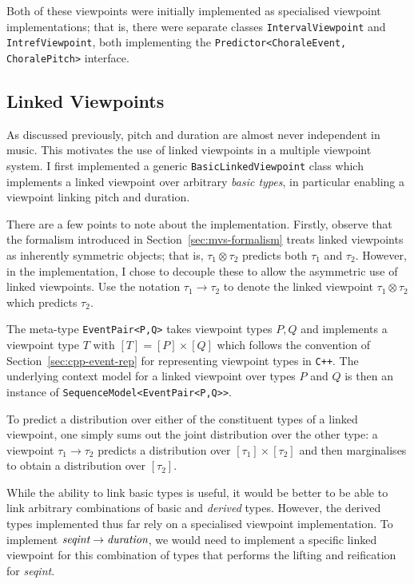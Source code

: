 \documentclass[12pt,a4paper,twoside,openright]{report}
\begin{document}
Both of these viewpoints were initially implemented as specialised viewpoint
implementations; that is, there were separate classes \texttt{IntervalViewpoint}
and \texttt{IntrefViewpoint}, both implementing the
\texttt{Predictor<ChoraleEvent, ChoralePitch>} interface.

\subsection{Linked Viewpoints}\label{sec:impl-linked-vps}

As discussed previously, pitch and duration are almost never independent in
music. This motivates the use of linked viewpoints in a multiple viewpoint
system. I first implemented a generic \texttt{BasicLinkedViewpoint} class which
implements a linked viewpoint over arbitrary \emph{basic types}, in particular
enabling a viewpoint linking pitch and duration.

There are a few points to note about the implementation. Firstly, observe that
the formalism introduced in Section~\ref{sec:mvs-formalism} treats linked
viewpoints as inherently symmetric objects; that is, $\tau_1 \otimes \tau_2$
predicts both $\tau_1$ and $\tau_2$. However, in the implementation, I chose to
decouple these to allow the asymmetric use of linked viewpoints. Use the
notation $\tau_1 \rightarrow \tau_2$ to denote the linked viewpoint $\tau_1
\otimes \tau_2$ which predicts $\tau_2$.

The meta-type \texttt{EventPair<P,Q>} takes viewpoint types $P,Q$ and implements
a viewpoint type $T$ with $[T] = [P] \times [Q]$ which follows the convention of
Section~\ref{sec:cpp-event-rep} for representing viewpoint types in
\texttt{C++}. The underlying context model for a linked viewpoint over types $P$
and $Q$ is then an instance of \texttt{SequenceModel<EventPair<P,Q>>}.

To predict a distribution over either of the constituent types of a linked
viewpoint, one simply sums out the joint distribution over the other type: a
viewpoint $\tau_1 \rightarrow \tau_2$ predicts a distribution over $[\tau_1]
\times [\tau_2]$ and then marginalises to obtain a distribution over $[\tau_2]$.

While the ability to link basic types is useful, it would be better to be able
to link arbitrary combinations of basic and \emph{derived} types. However, the
derived types implemented thus far rely on a specialised viewpoint
implementation. To implement $\emph{seqint} \rightarrow \emph{duration}$, we
would need to implement a specific linked viewpoint for this combination of
types that performs the lifting and reification for \emph{seqint}.
\end{document}
